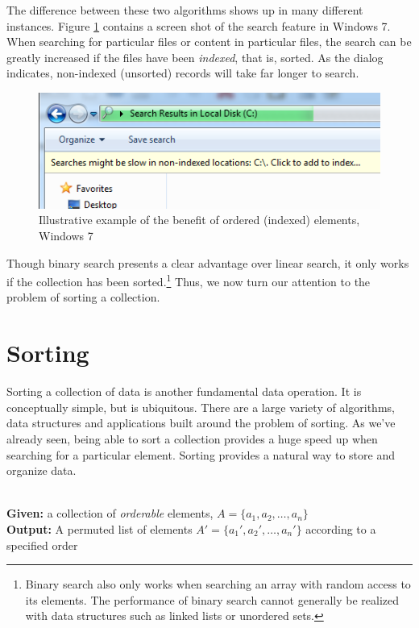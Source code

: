 The difference between these two algorithms shows up in many different instances.
Figure \ref{figure:windows7Example} contains a screen shot of the search feature
in Windows 7.  When searching for particular files or content in particular files,
the search can be greatly increased if the files have been \emph{indexed}, that
is, sorted.  As the dialog indicates, non-indexed (unsorted) records will take
far longer to search.

\begin{figure}[h]
\centering
\includegraphics[scale=0.5]{images/windows7Example}
\caption{Illustrative example of the benefit of ordered (indexed) elements, Windows 7}
\label{figure:windows7Example}
\end{figure}

Though binary search presents a clear advantage over linear search, it only works
if the collection has been sorted.\footnote{Binary search also only works when
searching an array with random access to its elements.  The performance of binary
search cannot generally be realized with data structures such as linked lists or 
unordered sets.}  Thus, we now turn our attention to the problem of sorting
a collection.

\section{Sorting}

Sorting a collection of data is another fundamental data operation.  It is
conceptually simple, but is ubiquitous.  There are a large variety of
algorithms, data structures and applications built around the problem
of sorting.  As we've already seen, being able to sort a collection provides 
a huge speed up when searching for a particular element.  Sorting provides 
a natural way to store and organize data.  

\begin{problem}[Sorting]
~\\
\textbf{Given:} a collection of \emph{orderable} elements, $A =\{a_1, a_2, \ldots, a_n\}$\\
\textbf{Output:} A permuted list of elements $A' = \{a_1', a_2', \ldots, a_n'\}$ according to a specified order
\end{problem}

